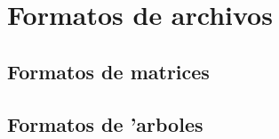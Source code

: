 \chapter{Formatos de archivos}
\section{Formatos de matrices}



%

\section{Formatos de 'arboles}




